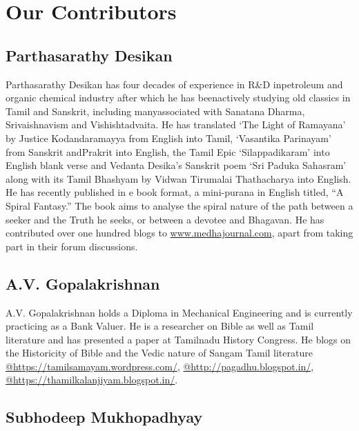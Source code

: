 
\chapter*{Our Contributors }\label{contributors}

\vskip 4pt

\section*{Parthasarathy Desikan}

\vskip 4pt

Parthasarathy Desikan has four decades of experience in R\&D in\break petroleum and organic chemical industry after which he has been\break actively studying old classics in Tamil and Sanskrit, including many\break associated with Sanatana Dharma, Srivaishnavism and Vishishtadvaita. He has translated `The Light of Ramayana' by Justice Kodandaramayya from English into Tamil, `Vasantika Parinayam' from Sanskrit and\break Prakrit into English, the Tamil Epic `Silappadikaram' into English blank verse and Vedanta Desika’s Sanskrit poem `Sri Paduka Sahasram' along with its Tamil Bhashyam by Vidwan Tirumalai Thathacharya into English. He has recently published in e book format, a mini-purana in English titled, “A Spiral Fantasy.” The book aims to analyse the spiral nature of the path between a seeker and the Truth he seeks, or between a devotee and Bhagavan. He has contributed over one hundred blogs to \url{www.medhajournal.com}, apart from taking part in their forum discussions.

\vskip 4pt

\section*{A.V. Gopalakrishnan}

\vskip 4pt

A.V. Gopalakrishnan holds a Diploma in Mechanical Engineering and is currently practicing as a Bank Valuer. He is a researcher on Bible as well as Tamil literature and has presented a paper at Tamilnadu History Congress. He blogs on the Historicity of Bible and the Vedic nature of Sangam Tamil literature \url{@https://tamilsamayam.wordpress.com/}, \url{@http://pagadhu.blogspot.in/}, \url{@https://thamilkalanjiyam.blogspot.in/}.

\section*{Subhodeep Mukhopadhyay}

